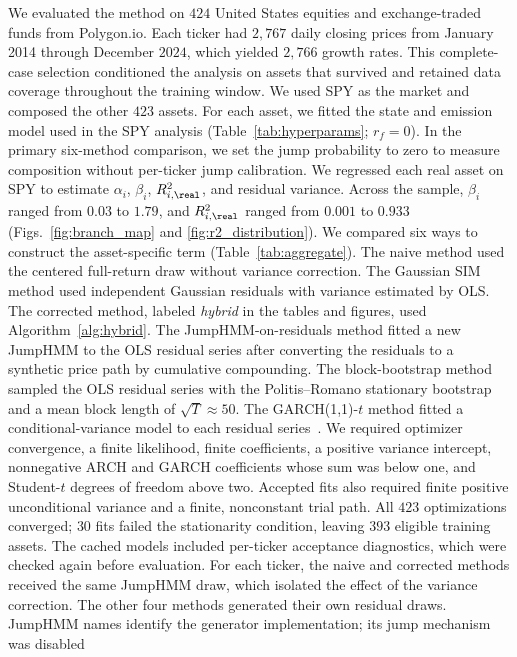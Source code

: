 We evaluated the method on $424$ United States equities and exchange-traded funds
from Polygon.io. Each ticker had $2{,}767$ daily closing prices from
January 2014 through December $2024$, which yielded $2{,}766$ growth
rates. This complete-case selection conditioned the analysis on assets
that survived and retained data coverage throughout the training
window. We used SPY as the market and composed the other $423$ assets.
For each asset, we fitted the state and emission model used in the SPY
analysis (Table~\ref{tab:hyperparams}; $r_f=0$). In the primary
six-method comparison, we set the jump probability to zero to measure
composition without per-ticker jump calibration. We regressed each
real asset on SPY to estimate $\alpha_i$, $\beta_i$, $R^2_{i,\real}$,
and residual variance. Across the sample, $\beta_i$ ranged from $0.03$
to $1.79$, and $R^2_{i,\real}$ ranged from $0.001$ to $0.933$
(Figs.~\ref{fig:branch_map} and \ref{fig:r2_distribution}).
We compared six ways to construct the asset-specific term
(Table~\ref{tab:aggregate}). The naive
method used the centered full-return draw without variance correction. The Gaussian
SIM method used independent Gaussian residuals with variance estimated
by OLS. The corrected method, labeled \emph{hybrid} in the tables and
figures, used Algorithm~\ref{alg:hybrid}. The
JumpHMM-on-residuals method fitted a new JumpHMM to the OLS residual
series after converting the residuals to a synthetic price path by
cumulative compounding. The block-bootstrap method sampled the OLS
residual series with the Politis--Romano stationary
bootstrap~\cite{politisRomano1994} and a mean block length of
$\sqrt{T}\approx 50$. The GARCH(1,1)-$t$ method fitted a
conditional-variance model to each residual series~\cite{bollerslev1986}.
We required optimizer convergence, a finite likelihood, finite
coefficients, a positive variance intercept, nonnegative ARCH and
GARCH coefficients whose sum was below one, and Student-$t$ degrees
of freedom above two. Accepted fits also required finite positive
unconditional variance and a finite, nonconstant trial path. All $423$
optimizations converged; $30$ fits failed the stationarity condition,
leaving $393$ eligible training assets. The cached models included
per-ticker acceptance diagnostics, which were checked again before
evaluation.
For each ticker, the naive and corrected methods received the same
JumpHMM draw, which isolated the effect of the variance correction. The
other four methods generated their own residual draws. JumpHMM names
identify the generator implementation; its jump mechanism was disabled
